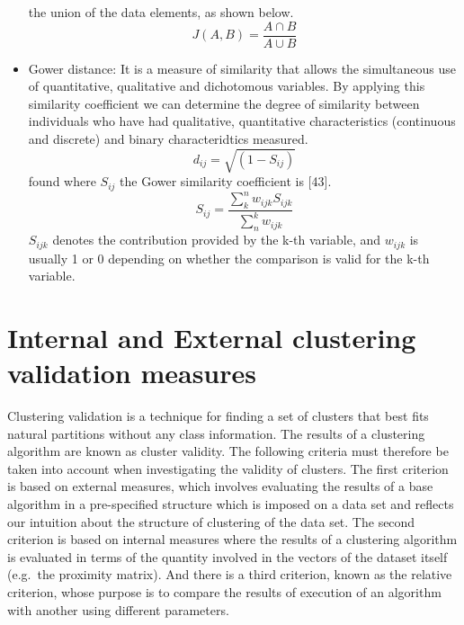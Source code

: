 \documentclass[
]{article}
\begin{document}
\begin{itemize}
  the union of the data elements, as shown below. \begin{equation}
        J(A,B) = \frac{A \cap B}{A \cup B}
    \end{equation}
\item
  Gower distance: It is a measure of similarity that allows the
  simultaneous use of quantitative, qualitative and dichotomous
  variables. By applying this similarity coefficient we can determine
  the degree of similarity between individuals who have had qualitative,
  quantitative characteristics (continuous and discrete) and binary
  characteridtics measured. \begin{equation}
        d_{ij}=\sqrt{(1-S_{ij})}
    \end{equation} found where \(S_{ij}\) the Gower similarity
  coefficient is {[}43{]}. \begin{equation}
        S_{ij}=\frac{\sum_{k}^{n}w_{ijk}S_{ijk}}{\sum_{n}^{k}w_{ijk}}
    \end{equation} \(S_{ijk}\) denotes the contribution provided by the
  k-th variable, and \(w_{ijk}\) is usually 1 or 0 depending on whether
  the comparison is valid for the k-th variable.
\end{itemize}

\hypertarget{internal-and-external-clustering-validation-measures}{%
\section{\texorpdfstring{Internal and External clustering validation
measures
\label{sec:seccion2}}{Internal and External clustering validation measures }}\label{internal-and-external-clustering-validation-measures}}

Clustering validation is a technique for finding a set of clusters that
best fits natural partitions without any class information. The results
of a clustering algorithm are known as cluster validity. The following
criteria must therefore be taken into account when investigating the
validity of clusters. The first criterion is based on external measures,
which involves evaluating the results of a base algorithm in a
pre-specified structure which is imposed on a data set and reflects our
intuition about the structure of clustering of the data set. The second
criterion is based on internal measures where the results of a
clustering algorithm is evaluated in terms of the quantity involved in
the vectors of the dataset itself (e.g.~the proximity matrix). And there
is a third criterion, known as the relative criterion, whose purpose is
to compare the results of execution of an algorithm with another using
different parameters.
\end{document}
